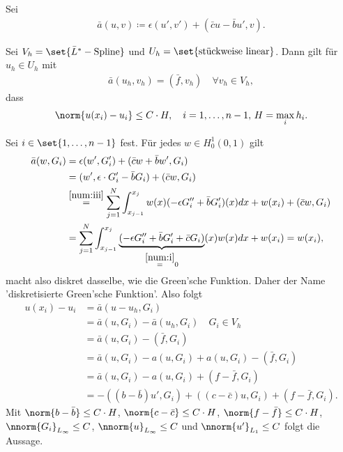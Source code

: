 Sei
\begin{align*}
  \bar a (u, v)\coloneqq \epsilon (u', v') + (\bar c u - \bar b u', v). 
\end{align*}
\begin{satz}\label{thm:6-3}
  Sei $V_{h} = \set{\bar L^{*} - \text{Spline}}$ und $U_{h} = \set{\text{stückweise linear}}$. 
Dann gilt für $u_{h} \in U_{h}$ mit
\begin{align*}
  \bar a(u_{h}, v_{h}) = (\bar f, v_{h})\quad \forall v_{h} \in V_{h}, 
\end{align*}
dass
\begin{align*}
\norm{u(x_{i}) - u_{i}} \leq C\cdot H, \quad i = 1, \dots, n-1, \, H = \max_{i} h_{i}. 
\end{align*}
\end{satz}
\begin{beweis}
  Sei $i \in \set{1, \dots, n-1}$ fest. Für jedes $w \in H_{0}^{1}(0, 1)$ gilt
  \begin{align*}
    \bar a(w, G_{i}) &= \epsilon (w', G_{i}') + (\bar c w + \bar b w', G_{i})\\
    &= (w', \epsilon\cdot  G_{i}' - \bar b G_{i}) + (\bar c w, G_{i})\\
    &\stackrel{\ref{num:iii}} = \sum_{j = 1}^{N} \int_{x_{j-1}}^{x_{j}} w(x) (-\epsilon G_{i}'' + \bar b G_{i}')(x) dx + w(x_{i}) + (\bar c w, G_{i})\\
    & = \sum_{j = 1}^{N} \int_{x_{j-1}}^{x_{j}}  \underbrace{(-\epsilon G_{i}'' + \bar b G_{i}' + \bar c G_{i})}_{\stackrel{\ref{num:i}}= 0}(x)  w(x)dx + w(x_{i})  = w(x_{i}), 
  \end{align*}
macht also diskret dasselbe, wie die Green'sche Funktion. Daher der Name 'diskretisierte Green'sche Funktion'. Also folgt
\begin{align*}
  u(x_{i}) - u_{i} &= \bar a (u - u_{h}, G_{i})\\
&= \bar a (u, G_{i}) -\bar a (u_{h}, G_{i}) \quad G_{i} \in V_{h}\\
&= \bar a (u, G_{i}) - (\bar f , G_{i}) \\
&= \bar a (u, G_{i}) - a(u , G_{i}) + a(u , G_{i})  - (\bar f, G_{i})\\
&= \bar a (u, G_{i}) - a(u , G_{i}) +( f - \bar f, G_{i})\\
&= - ((b - \bar b)u', G_{i}) + ((c-\bar c) u, G_{i}) + ( f - \bar f, G_{i}). 
\end{align*}
Mit $\norm{b - \bar b} \leq C\cdot H$, $\norm{c - \bar c} \leq C\cdot H$, $\norm{f - \bar f} \leq C\cdot H$, $\nnorm{G_{i}}_{L_{\infty}}\leq C$, $\nnorm{u}_{L_{\infty}}\leq C$ und $\nnorm{u'}_{L_{1}}\leq C$ folgt die Aussage. 
\end{beweis}
